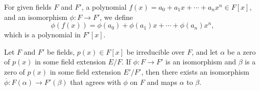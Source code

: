 \begin{definition}
    For given fields $F$ and $F'$, a polynomial $f(x) = a_0 + a_1x + \cdots + a_nx^n \in F[x]$, and an isomorphism $\phi: F \to F'$, we define
    \[
        \phi(f(x)) = \phi(a_0) + \phi(a_1)x + \cdots + \phi(a_n)x^n,
    \]
    which is a polynomial in $F'[x]$.
\end{definition}

\begin{lemma}\label{lemma-isomorphism-extension}
    Let $F$ and $F'$ be fields, $p(x) \in F[x]$ be irreducible over $F$, and let $\alpha$ be a zero of $p(x)$ in some field extension $E/F$. If $\phi: F \to F'$ is an isomorphism and $\beta$ is a zero of $p(x)$ in some field extension $E'/F'$, then there exists an isomorphism $\overline{\phi}: F(\alpha) \to F'(\beta)$ that agrees with $\phi$ on $F$ and maps $\alpha$ to $\beta$.
\end{lemma}
